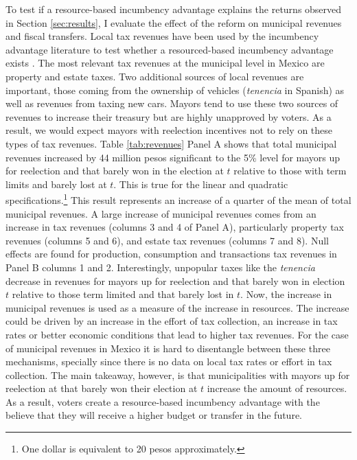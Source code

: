 \documentclass[12pt]{amsart}
\numberwithin{equation}{section}
\theoremstyle{definition}
\theoremstyle{definition}
\theoremstyle{definition}
\begin{document}
To test if a resource-based incumbency advantage explains the returns observed in Section \ref{sec:results}, I evaluate the effect of the reform on municipal revenues and fiscal transfers. Local tax revenues have been used by the incumbency advantage literature to test whether a resourced-based incumbency advantage exists \citep{fiorina_1989, cox_morgensten_1993}. The most relevant tax revenues at the municipal level in Mexico are property and estate taxes. Two additional sources of local revenues are important, those coming from the ownership of vehicles (\emph{tenencia} in Spanish) as well as revenues from taxing new cars. Mayors tend to use these two sources of revenues to increase their treasury but are highly unapproved by voters. As a result, we would expect mayors with reelection incentives not to rely on these types of tax revenues. Table \ref{tab:revenues} Panel A shows that total municipal revenues increased by 44 million pesos significant to the 5\% level for mayors up for reelection and that barely won in the election at $t$ relative to those with term limits and barely lost at $t$.  This is true for the linear and quadratic specifications.\footnote{One dollar is equivalent to 20 pesos approximately.} This result represents an increase of a quarter of the mean of total municipal revenues. A large increase of municipal revenues comes from an increase in tax revenues (columns 3 and 4 of Panel A), particularly property tax revenues (columns 5 and 6), and estate tax revenues (columns 7 and 8). Null effects are found for production, consumption and transactions tax revenues in Panel B columns 1 and 2. Interestingly, unpopular taxes like the \emph{tenencia} decrease in revenues for mayors up for reelection and that barely won in election $t$ relative to those term limited and that barely lost in $t$. Now, the increase in municipal revenues is used as a measure of the increase in resources. The increase could be driven by an increase in the effort of tax collection, an increase in tax rates or better economic conditions that lead to higher tax revenues. For the case of municipal revenues in Mexico it is hard to disentangle between these three mechanisms, specially since there is no data on local tax rates or effort in tax collection. The main takeaway, however, is that municipalities with mayors up for reelection at that barely won their election at $t$ increase the amount of resources. As a result, voters create a resource-based incumbency advantage with the believe that they will receive a higher budget or transfer in the future. %
\end{document}
